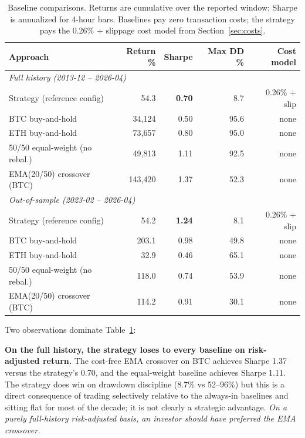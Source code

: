 \documentclass{article}
\begin{document}
\begin{table}[h]
\centering
\caption{Baseline comparisons. Returns are cumulative over the reported window; Sharpe is annualized for 4-hour bars. Baselines pay zero transaction costs; the strategy pays the 0.26\% + slippage cost model from Section~\ref{sec:costs}.}
\label{tab:baselines}
\small
\begin{tabular}{@{}lrrrr@{}}
\toprule
\textbf{Approach} & \textbf{Return \%} & \textbf{Sharpe} & \textbf{Max DD \%} & \textbf{Cost model} \\
\midrule
\multicolumn{5}{l}{\emph{Full history (2013-12 -- 2026-04)}} \\
Strategy (reference config) & 54.3 & \textbf{0.70} & 8.7 & 0.26\% + slip \\
BTC buy-and-hold            & 34,124 & 0.50 & 95.6 & none \\
ETH buy-and-hold            & 73,657 & 0.80 & 95.0 & none \\
50/50 equal-weight (no rebal.) & 49,813 & 1.11 & 92.5 & none \\
EMA(20/50) crossover (BTC)  & 143,420 & 1.37 & 52.3 & none \\
\midrule
\multicolumn{5}{l}{\emph{Out-of-sample (2023-02 -- 2026-04)}} \\
Strategy (reference config) & 54.2 & \textbf{1.24} & 8.1 & 0.26\% + slip \\
BTC buy-and-hold            & 203.1 & 0.98 & 49.8 & none \\
ETH buy-and-hold            & 32.9 & 0.46 & 65.1 & none \\
50/50 equal-weight (no rebal.) & 118.0 & 0.74 & 53.9 & none \\
EMA(20/50) crossover (BTC)  & 114.2 & 0.91 & 30.1 & none \\
\bottomrule
\end{tabular}
\end{table}

Two observations dominate Table~\ref{tab:baselines}:

\textbf{On the full history, the strategy loses to every baseline on risk-adjusted return.} The cost-free EMA crossover on BTC achieves Sharpe 1.37 versus the strategy's 0.70, and the equal-weight baseline achieves Sharpe 1.11. The strategy does win on drawdown discipline (8.7\% vs 52--96\%) but this is a direct consequence of trading selectively relative to the always-in baselines and sitting flat for most of the decade; it is not clearly a strategic advantage. \emph{On a purely full-history risk-adjusted basis, an investor should have preferred the EMA crossover.}
\end{document}
